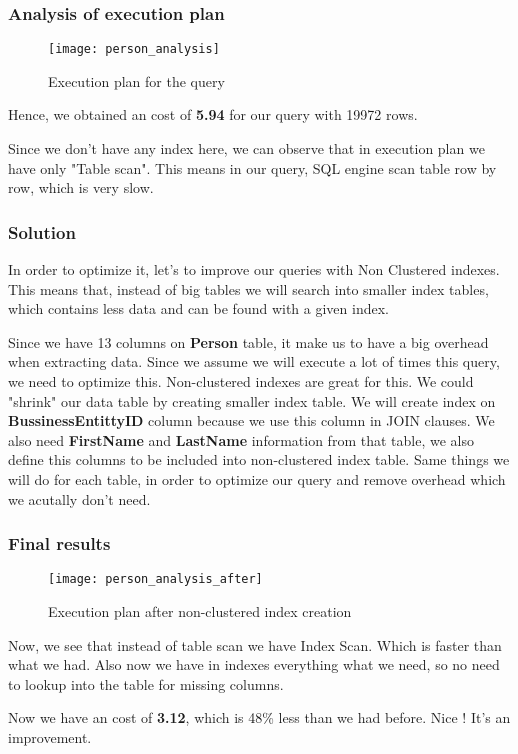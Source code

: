 \subsubsection{Analysis of execution plan}
\begin{figure}[ht!]
	\centering
	\texttt{[image: person\_analysis]}
	\caption{Execution plan for the query}
\end{figure}

Hence, we obtained an cost of \textbf{5.94} for our query with 19972 rows.

Since we don't have any index here, we can observe that in execution plan we have only "Table scan". This means in our query, SQL engine scan table row by row, which is very slow. 

\subsubsection{Solution}
In order to optimize it, let's to improve our queries with Non Clustered indexes. This means that, instead of big tables we will search into smaller index tables, which contains less data and can be found with a given index.

Since we have 13 columns on \textbf{Person} table, it make us to have a big overhead when extracting data. Since we assume we will execute a lot of times this query, we need to optimize this. Non-clustered indexes are great for this. We could "shrink" our data table by creating smaller index table. We will create index on \textbf{BussinessEntittyID} column because we use this column in JOIN clauses. We also need \textbf{FirstName} and \textbf{LastName} information from that table, we also define this columns to be included into non-clustered index table. Same things we will do for each table, in order to optimize our query and remove overhead which we acutally don't need.



\subsubsection{Final results}
\begin{figure}[ht!]
	\centering
	\texttt{[image: person\_analysis\_after]}
	\caption{Execution plan after non-clustered index creation}
\end{figure}

Now, we see that instead of table scan we have Index Scan. Which is faster than what we had. Also now we have in indexes everything what we need, so no need to lookup into the table for missing columns.

Now we have an cost of \textbf{3.12}, which is 48\% less than we had before. Nice ! It's an improvement.

\clearpage